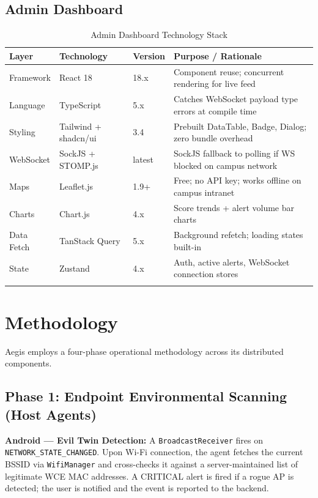 \documentclass[12pt,a4paper]{report}
\begin{document}
\section{Admin Dashboard}

\begin{longtable}{@{}p{2.5cm}p{3.5cm}p{2cm}p{5.5cm}@{}}
  \toprule
  \textbf{Layer} & \textbf{Technology} & \textbf{Version} & \textbf{Purpose / Rationale} \\
  \midrule
  \endhead
  Framework   & React 18        & 18.x      & Component reuse; concurrent rendering for live feed \\
  Language    & TypeScript      & 5.x       & Catches WebSocket payload type errors at compile time \\
  Styling     & Tailwind + shadcn/ui & 3.4   & Prebuilt DataTable, Badge, Dialog; zero bundle overhead \\
  WebSocket   & SockJS + STOMP.js & latest  & SockJS fallback to polling if WS blocked on campus network \\
  Maps        & Leaflet.js      & 1.9+      & Free; no API key; works offline on campus intranet \\
  Charts      & Chart.js        & 4.x       & Score trends + alert volume bar charts \\
  Data Fetch  & TanStack Query  & 5.x       & Background refetch; loading states built-in \\
  State       & Zustand         & 4.x       & Auth, active alerts, WebSocket connection stores \\
  \bottomrule
  \caption{Admin Dashboard Technology Stack}
\end{longtable}

\chapter{Methodology}

Aegis employs a four-phase operational methodology across its distributed components.

\section{Phase 1: Endpoint Environmental Scanning (Host Agents)}

\textbf{Android — Evil Twin Detection:} A \texttt{BroadcastReceiver} fires on \texttt{NETWORK\_STATE\_CHANGED}. Upon Wi-Fi connection, the agent fetches the current BSSID via \texttt{WifiManager} and cross-checks it against a server-maintained list of legitimate WCE MAC addresses. A CRITICAL alert is fired if a rogue AP is detected; the user is notified and the event is reported to the backend.
\end{document}
